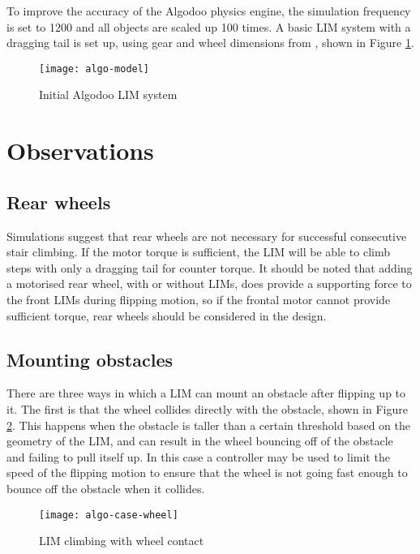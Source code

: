 To improve the accuracy of the Algodoo physics engine, the simulation frequency is set to 1200 and all objects are scaled up 100 times. A basic LIM system with a dragging tail is set up, using gear and wheel dimensions from \cite{Powrie-2019}, shown in Figure \ref{algo-model}.

\begin{figure}[h]
	\centering
	\texttt{[image: algo-model]}
	\caption{Initial Algodoo LIM system}
	\label{algo-model}
\end{figure}
\section{Observations}

\subsection{Rear wheels}

Simulations suggest that rear wheels are not necessary for successful consecutive stair climbing. If the motor torque is sufficient, the LIM will be able to climb steps with only a dragging tail for counter torque. It should be noted that adding a motorised rear wheel, with or without LIMs, does provide a supporting force to the front LIMs during flipping motion, so if the frontal motor cannot provide sufficient torque, rear wheels should be considered in the design.

\subsection{Mounting obstacles}

There are three ways in which a LIM can mount an obstacle after flipping up to it. The first is that the wheel collides directly with the obstacle, shown in Figure \ref{algo-case-wheel}. This happens when the obstacle is taller than a certain threshold based on the geometry of the LIM, and can result in the wheel bouncing off of the obstacle and failing to pull itself up. In this case a controller may be used to limit the speed of the flipping motion to ensure that the wheel is not going fast enough to bounce off the obstacle when it collides. \\

\begin{figure}[h]
	\centering
	\texttt{[image: algo-case-wheel]}
	\caption{LIM climbing with wheel contact}
	\label{algo-case-wheel}
\end{figure}


